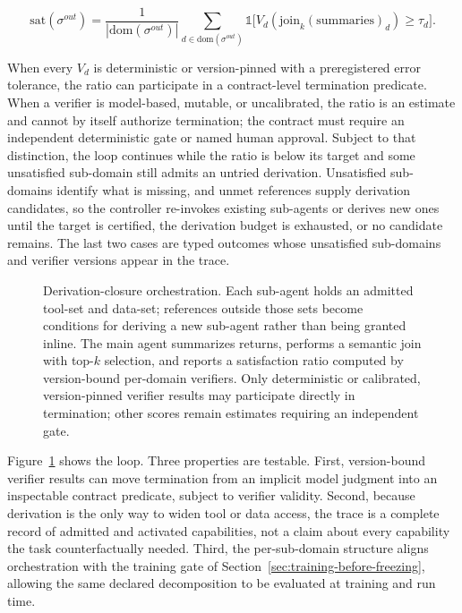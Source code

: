 \begin{equation}
\mathrm{sat}(\sigma^{out})=\frac{1}{|\mathrm{dom}(\sigma^{out})|}\sum_{d\in\mathrm{dom}(\sigma^{out})} \mathbb{1}\big[V_d(\mathrm{join}_k(\text{summaries})_d)\geq\tau_d\big].
\end{equation}

When every $V_d$ is deterministic or version-pinned with a preregistered error tolerance, the ratio can participate in a contract-level termination predicate. When a verifier is model-based, mutable, or uncalibrated, the ratio is an estimate and cannot by itself authorize termination; the contract must require an independent deterministic gate or named human approval. Subject to that distinction, the loop continues while the ratio is below its target and some unsatisfied sub-domain still admits an untried derivation. Unsatisfied sub-domains identify what is missing, and unmet references supply derivation candidates, so the controller re-invokes existing sub-agents or derives new ones until the target is certified, the derivation budget is exhausted, or no candidate remains. The last two cases are typed outcomes whose unsatisfied sub-domains and verifier versions appear in the trace.

\begin{figure}[t]
\centering
\caption{Derivation-closure orchestration. Each sub-agent holds an admitted tool-set and data-set; references outside those sets become conditions for deriving a new sub-agent rather than being granted inline. The main agent summarizes returns, performs a semantic join with top-$k$ selection, and reports a satisfaction ratio computed by version-bound per-domain verifiers. Only deterministic or calibrated, version-pinned verifier results may participate directly in termination; other scores remain estimates requiring an independent gate.}
\label{fig:derivation-closure}
\end{figure}

Figure~\ref{fig:derivation-closure} shows the loop. Three properties are testable. First, version-bound verifier results can move termination from an implicit model judgment into an inspectable contract predicate, subject to verifier validity. Second, because derivation is the only way to widen tool or data access, the trace is a complete record of admitted and activated capabilities, not a claim about every capability the task counterfactually needed. Third, the per-sub-domain structure aligns orchestration with the training gate of Section~\ref{sec:training-before-freezing}, allowing the same declared decomposition to be evaluated at training and run time.

